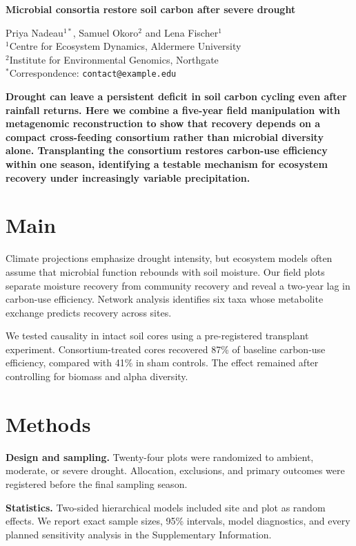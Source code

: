 \documentclass[12pt]{article}
\begin{document}
{\LARGE\bfseries Microbial consortia restore soil carbon after severe drought\par}
\vspace{0.7em}
{\large Priya Nadeau$^{1*}$, Samuel Okoro$^2$ and Lena Fischer$^1$}\\
$^1$Centre for Ecosystem Dynamics, Aldermere University\\
$^2$Institute for Environmental Genomics, Northgate\\
$^*$Correspondence: \texttt{contact@example.edu}

\vspace{1em}
\textbf{Drought can leave a persistent deficit in soil carbon cycling even
after rainfall returns. Here we combine a five-year field manipulation with
metagenomic reconstruction to show that recovery depends on a compact
cross-feeding consortium rather than microbial diversity alone. Transplanting
the consortium restores carbon-use efficiency within one season, identifying
a testable mechanism for ecosystem recovery under increasingly variable
precipitation.}

\section*{Main}
Climate projections emphasize drought intensity, but ecosystem models often
assume that microbial function rebounds with soil moisture. Our field plots
separate moisture recovery from community recovery and reveal a two-year lag
in carbon-use efficiency. Network analysis identifies six taxa whose metabolite
exchange predicts recovery across sites.

We tested causality in intact soil cores using a pre-registered transplant
experiment. Consortium-treated cores recovered 87\% of baseline carbon-use
efficiency, compared with 41\% in sham controls. The effect remained after
controlling for biomass and alpha diversity.

\section*{Methods}
\textbf{Design and sampling.} Twenty-four plots were randomized to ambient,
moderate, or severe drought. Allocation, exclusions, and primary outcomes were
registered before the final sampling season.

\textbf{Statistics.} Two-sided hierarchical models included site and plot as
random effects. We report exact sample sizes, 95\% intervals, model diagnostics,
and every planned sensitivity analysis in the Supplementary Information.
\end{document}
